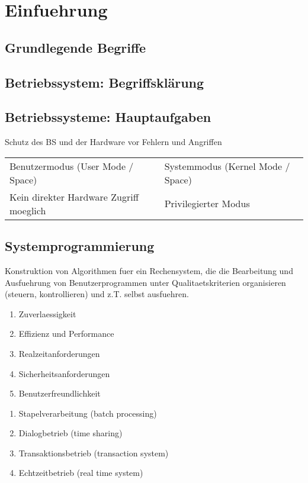 \chapter{Einfuehrung}
\section{Grundlegende Begriffe}

\section{Betriebssystem: Begriffsklärung}

\section{Betriebssysteme: Hauptaufgaben}
\noindent Schutz des BS und der Hardware vor Fehlern und Angriffen

\begin{longtable}{ll}
	Benutzermodus (User Mode / Space)& Systemmodus (Kernel Mode / Space)\\
	Kein direkter Hardware Zugriff moeglich& Privilegierter Modus\\ 
\end{longtable}


\section{Systemprogrammierung}

\noindent Konstruktion von Algorithmen fuer ein Rechensystem, die die Bearbeitung und Ausfuehrung von Benutzerprogrammen unter Qualitaetskriterien organisieren (steuern, kontrollieren) und z.T. selbst ausfuehren.

\begin{enumerate}
	\setlength\itemsep{0em}
	\item Zuverlaessigkeit
	\item Effizienz und Performance
	\item Realzeitanforderungen
	\item Sicherheitsanforderungen
	\item Benutzerfreundlichkeit
\end{enumerate}

\begin{enumerate}
	\setlength\itemsep{0em}
	\item Stapelverarbeitung (batch processing)
	\item Dialogbetrieb (time sharing)
	\item Transaktionsbetrieb (transaction system)
	\item Echtzeitbetrieb (real time system)
\end{enumerate}

